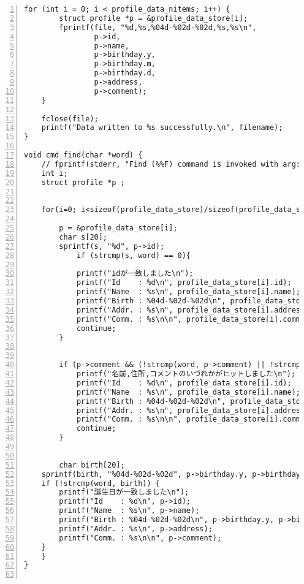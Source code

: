 \begin{Verbatim}[numbers=left, xleftmargin=10mm, numbersep=6pt,
                    fontsize=\small, baselinestretch=0.8]
    for (int i = 0; i < profile_data_nitems; i++) {
        struct profile *p = &profile_data_store[i];
        fprintf(file, "%d,%s,%04d-%02d-%02d,%s,%s\n",
                p->id,
                p->name,
                p->birthday.y,
                p->birthday.m,
                p->birthday.d,
                p->address,
                p->comment);
    }

    fclose(file);
    printf("Data written to %s successfully.\n", filename);
}

void cmd_find(char *word) {
    // fprintf(stderr, "Find (%%F) command is invoked with arg: '%s'\n", word);
    int i;
    struct profile *p ;
    

    for(i=0; i<sizeof(profile_data_store)/sizeof(profile_data_store[0]); i++) {

        p = &profile_data_store[i];
        char s[20];
        sprintf(s, "%d", p->id);
            if (strcmp(s, word) == 0){
                
            printf("idが一致しました\n");
            printf("Id    : %d\n", profile_data_store[i].id);
            printf("Name  : %s\n", profile_data_store[i].name);
            printf("Birth : %04d-%02d-%02d\n", profile_data_store[i].birthday.y, profile_data_store[i].birthday.m, profile_data_store[i].birthday.d);
            printf("Addr. : %s\n", profile_data_store[i].address);
            printf("Comm. : %s\n\n", profile_data_store[i].comment);
            continue;
        }

        
        if (p->comment && (!strcmp(word, p->comment) || !strcmp(word, p->name) || !strcmp(word, p->address))) {
            printf("名前,住所,コメントのいづれかがヒットしました\n");
            printf("Id    : %d\n", profile_data_store[i].id);
            printf("Name  : %s\n", profile_data_store[i].name);
            printf("Birth : %04d-%02d-%02d\n", profile_data_store[i].birthday.y, profile_data_store[i].birthday.m, profile_data_store[i].birthday.d);
            printf("Addr. : %s\n", profile_data_store[i].address);
            printf("Comm. : %s\n\n", profile_data_store[i].comment);
            continue;
        }

        
        char birth[20];
    sprintf(birth, "%04d-%02d-%02d", p->birthday.y, p->birthday.m, p->birthday.d);
    if (!strcmp(word, birth)) {
        printf("誕生日が一致しました\n");
        printf("Id    : %d\n", p->id);
        printf("Name  : %s\n", p->name);
        printf("Birth : %04d-%02d-%02d\n", p->birthday.y, p->birthday.m, p->birthday.d);
        printf("Addr. : %s\n", p->address);
        printf("Comm. : %s\n\n", p->comment);
    }
    }
}


\end{Verbatim}
